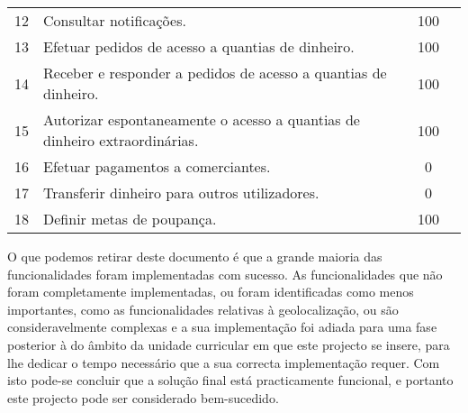 \begin{center}
\begin{longtable}{@{}lp{}cp{}@{}}
    12  & Consultar notificações.  & 100  &  \\
    13  & Efetuar pedidos de acesso a quantias de dinheiro.  & 100  &  \\
    14  & Receber e responder a pedidos de acesso a quantias de dinheiro.  & 100  &  \\
    15  & Autorizar espontaneamente o acesso a quantias de dinheiro extraordinárias.  & 100  &  \\
    16  & Efetuar pagamentos a comerciantes.  & 0  &  \\
    17  & Transferir dinheiro para outros utilizadores.  & 0  &  \\
    18  & Definir metas de poupança.  & 100  & 
\end{longtable}
\end{center}

O que podemos retirar deste documento é que a grande maioria das funcionalidades foram implementadas com sucesso.
As funcionalidades que não foram completamente implementadas, ou foram identificadas como menos importantes, como as funcionalidades relativas à geolocalização, ou são consideravelmente complexas e a sua implementação foi adiada para uma fase posterior à do âmbito da unidade curricular em que este projecto se insere, para lhe dedicar o tempo necessário que a sua correcta implementação requer.
Com isto pode-se concluir que a solução final está practicamente funcional, e portanto este projecto pode ser considerado bem-sucedido.
